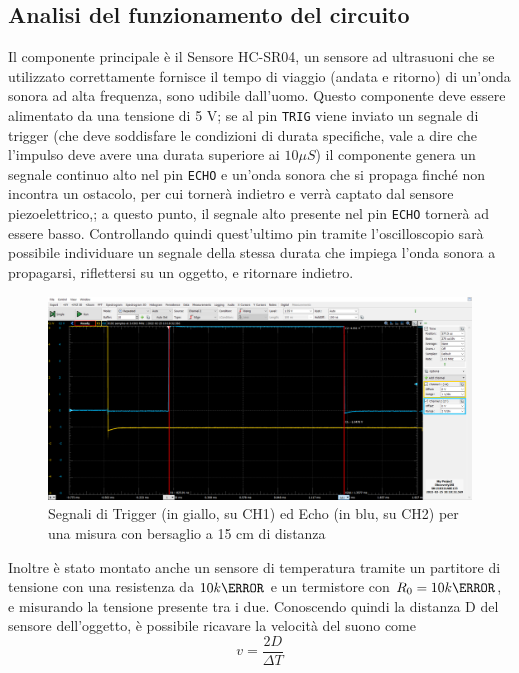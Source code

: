 \documentclass[10pt, a4paper, italian]{article}
\begin{document}
\subsection{Analisi del funzionamento del circuito}
Il componente principale è il Sensore HC-SR04, un sensore ad ultrasuoni che se utilizzato correttamente fornisce il tempo di viaggio (andata e ritorno) di un'onda sonora ad alta frequenza, sono udibile dall'uomo.
Questo componente deve essere alimentato da una tensione di 5 V; se al pin \verb+TRIG+ viene inviato un segnale di trigger (che deve soddisfare le condizioni di durata specifiche, vale a dire che l'impulso deve avere una durata superiore ai $10 \mu S$) il componente genera un segnale continuo alto nel pin \verb+ECHO+ e un'onda sonora che si propaga finché non incontra un ostacolo, per cui tornerà indietro e verrà captato dal sensore piezoelettrico,; a questo punto, il segnale alto presente nel pin \verb+ECHO+ tornerà ad essere basso. Controllando quindi quest'ultimo pin tramite l'oscilloscopio sarà possibile individuare un segnale della stessa durata che impiega l'onda sonora a propagarsi, riflettersi su un oggetto, e ritornare indietro.
\begin{figure}[H]
    \centering
	\includegraphics[scale=0.4]{echo}
    \caption{Segnali di Trigger (in giallo, su CH1) ed Echo (in blu, su CH2) per una misura con bersaglio a 15 cm di distanza}
\end{figure}
Inoltre è stato montato anche un sensore di temperatura tramite un partitore di tensione con una resistenza da $10 k\ohm$ e un termistore con $R_0 =10 k\ohm$, e misurando la tensione presente tra i due.
Conoscendo quindi la distanza D del sensore dell'oggetto, è possibile ricavare la velocità del suono come
\begin{equation}
v= \frac{2 D}{\Delta T}
\end{equation}
\end{document}
